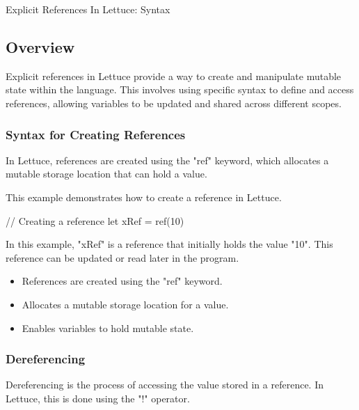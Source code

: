 \begin{notes}{Explicit References In Lettuce: Syntax}
    \subsection*{Overview}

    Explicit references in Lettuce provide a way to create and manipulate mutable state within the language. This involves using specific syntax to define and access references, allowing variables to 
    be updated and shared across different scopes.
    
    \subsubsection*{Syntax for Creating References}
    
    In Lettuce, references are created using the "ref" keyword, which allocates a mutable storage location that can hold a value.
    
    \begin{highlight}
    
        This example demonstrates how to create a reference in Lettuce.
    
    \begin{code}[Lettuce]
    // Creating a reference
    let xRef = ref(10)
    \end{code}
    
        In this example, "xRef" is a reference that initially holds the value "10". This reference can be updated or read later in the program.
    
        \begin{itemize}
            \item References are created using the "ref" keyword.
            \item Allocates a mutable storage location for a value.
            \item Enables variables to hold mutable state.
        \end{itemize}
    
    \end{highlight}
    
    \subsubsection*{Dereferencing}
    
    Dereferencing is the process of accessing the value stored in a reference. In Lettuce, this is done using the "!" operator.
    

\end{notes}
